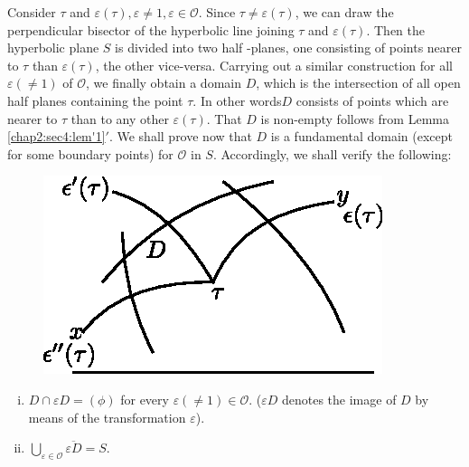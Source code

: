 Consider $\tau $ and $\varepsilon (\tau),  \varepsilon \neq 1,
\varepsilon \in \mathscr{O}$. Since $\tau \neq \varepsilon (\tau) $,
we can draw the perpendicular bisector of the hyperbolic line joining
$\tau $ and $\varepsilon (\tau)$. Then the hyperbolic plane $S$ is
divided into two half -planes, one consisting of points nearer to
$\tau$ than $\varepsilon (\tau)$, the other vice-versa. Carrying out a
similar construction for all $\varepsilon (\neq 1)$ of $\mathscr{O}$,
we finally obtain a domain $D$, which is the intersection of all open
half planes containing the point $\tau$. In other words\pageoriginale $D$ consists
of points which are nearer to $\tau$ than to any other $\varepsilon
(\tau)$. That $D$ is non-empty follows from Lemma \ref{chap2:sec4:lem'1}$'$.  We shall prove
now that $D$ is a fundamental domain (except for some boundary points)
for $\mathscr{O}$ in $S$. Accordingly, we shall verify the following: 

\begin{figure}[H]
\centerline{\includegraphics{vol9-figures/fig9-1.eps}}
\end{figure}
\begin{enumerate}[i)]
\item $D \cap \varepsilon D = (\phi)$ for every $\varepsilon (\neq 1)
  \in \mathscr{O}$. ($\varepsilon D$ denotes the image of $D$ by means
  of the transformation $\varepsilon$).  
\item $\bigcup\limits_{\varepsilon \in \mathscr{O}} \overline{\varepsilon D} = S$. 
\end{enumerate} 
 
